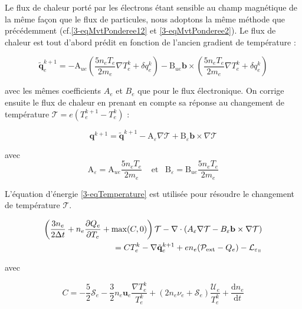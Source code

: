 \begin{refsection}
Le flux de chaleur porté par les électrons étant sensible au champ magnétique de
la même façon que le flux de particules, nous adoptons la même méthode que
précédemment (cf.\eqref{3-eqMvtPonderee12} et \eqref{3-eqMvtPonderee2}). Le flux de chaleur est tout d'abord
prédit en fonction de l'ancien gradient de température :

\begin{equation}
\label{3-eqChaleurPonderee}
\tilde{\mathbf{q}}_e^{k+1}=-\text{A}_{ue}(
\frac{5n_eT_e}{2m_e}\nabla T_e^k+\delta q_e^k)-\text{B}_{ue}\mathbf
b\times(\frac{5n_eT_e}{2m_e}\nabla T_e^k +\delta q_e^k)
\end{equation}

avec les mêmes coefficients $A_e$ et $B_e$ que pour le flux électronique. On
corrige ensuite le flux de chaleur en prenant en compte sa réponse au changement
de température $\mathcal T=e(T_e^{k+1}-T_e^k)$ :

\begin{equation}
\label{3-eqCorrectionVitesse}
\mathbf q^{k+1} = \tilde{\mathbf q}^{k+1}-\text{A}_\varepsilon\nabla
\mathcal T+\text{B}_\varepsilon\mathbf b\times\nabla
\mathcal T
\end{equation}

avec 
\begin{equation*}
\label{3-coefficientsChaleur}
\text{A}_\varepsilon=\text{A}_{ue}\frac{5n_eT_e}{2m_e}\;\;\;\;\text{et}\;\;\;\text{B}_\varepsilon=\text{B}_{ue}\frac{5n_eT_e}{2m_e}
\end{equation*}

L'équation d'énergie \eqref{3-eqTemperature} est utilisée pour résoudre le
changement de température $\mathcal T$. 

\begin{equation}
\label{3-eqTemperature2}
\begin{split}
\left(\frac{3n_e}{2\Delta
t}+n_e\frac{\partial Q_e}{\partial T_e}+\max(C,0)\right)\mathcal T
-\nabla\cdot\left(A_\varepsilon\nabla\mathcal T- B_\varepsilon\mathbf
b\times\nabla\mathcal T\right)\\ =  C T_e^k -\nabla\tilde{\mathbf q}_e^{k+1}+
en_e(\mathcal{P}_\text{ext}-Q_e)-\mathcal L_{\varepsilon_\para}
\end{split}\end{equation}

avec 

\begin{equation*}C=-\frac{5}{2}\mathcal S_e-\frac{3}{2}n_e\mathbf
u_e\frac{\nabla
T_e^k}{T_e^k}+(2n_e\nu_e+\mathcal{S}_e)\frac{\mathcal{U}_e}{T_e^k} +\frac{\text{d} n_e}{\text{d} t}
\end{equation*}


\end{refsection}
